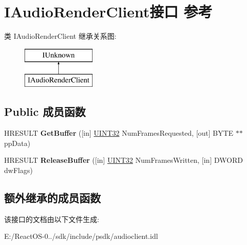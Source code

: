 \hypertarget{interface_i_audio_render_client}{}\section{I\+Audio\+Render\+Client接口 参考}
\label{interface_i_audio_render_client}
类 I\+Audio\+Render\+Client 继承关系图\+:\begin{figure}[H]
\begin{center}
\leavevmode
\includegraphics[height=2.000000cm]{interface_i_audio_render_client}
\end{center}
\end{figure}
\subsection*{Public 成员函数}
\begin{DoxyCompactItemize}
\item 
\mbox{\label{interface_i_audio_render_client_a95b76abd4eaa09db1f7516449156fa68}} 
H\+R\+E\+S\+U\+LT {\bfseries Get\+Buffer} (\mbox{[}in\mbox{]} \hyperlink{_processor_bind_8h_ae1e6edbbc26d6fbc71a90190d0266018}{U\+I\+N\+T32} Num\+Frames\+Requested, \mbox{[}out\mbox{]} B\+Y\+TE $\ast$$\ast$pp\+Data)
\item 
\mbox{\label{interface_i_audio_render_client_a570a7a3d061739ceb1074ace61b3c955}} 
H\+R\+E\+S\+U\+LT {\bfseries Release\+Buffer} (\mbox{[}in\mbox{]} \hyperlink{_processor_bind_8h_ae1e6edbbc26d6fbc71a90190d0266018}{U\+I\+N\+T32} Num\+Frames\+Written, \mbox{[}in\mbox{]} D\+W\+O\+RD dw\+Flags)
\end{DoxyCompactItemize}
\subsection*{额外继承的成员函数}


该接口的文档由以下文件生成\+:\begin{DoxyCompactItemize}
\item 
E\+:/\+React\+O\+S-\/0../sdk/include/psdk/audioclient.\+idl\end{DoxyCompactItemize}
